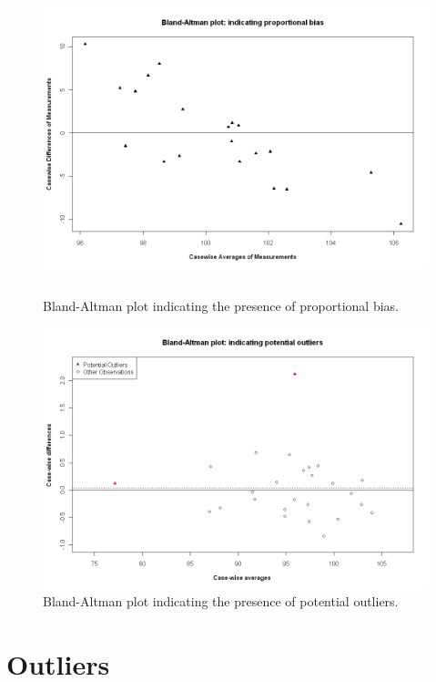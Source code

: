 \documentclass[12pt, a4paper]{report}
\theoremstyle{plain}
\theoremstyle{definition}
\theoremstyle{remark}
\begin{document}
	\begin{figure}[h!]
		\begin{center}
			\includegraphics[height=90mm]{images/PropBias.jpeg}
			\caption{Bland-Altman plot indicating the presence of proportional bias.}\label{PropBias}
		\end{center}
	\end{figure}
	
	\begin{figure}[h!]
		\begin{center}
			\includegraphics[width=125mm]{images/BAOutliers.jpeg}
			\caption{Bland-Altman plot indicating the presence of potential outliers.}\label{Outliers}
		\end{center}
	\end{figure}
	
	\newpage

\section{Outliers}
\end{document}
